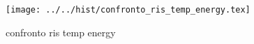 \begin{figure}[h] \centering\texttt{[image: ../../hist/confronto\_ris\_temp\_energy.tex]}\caption{confronto ris temp energy}\label{hist:confronto_ris_temp_energy} \end{figure}

